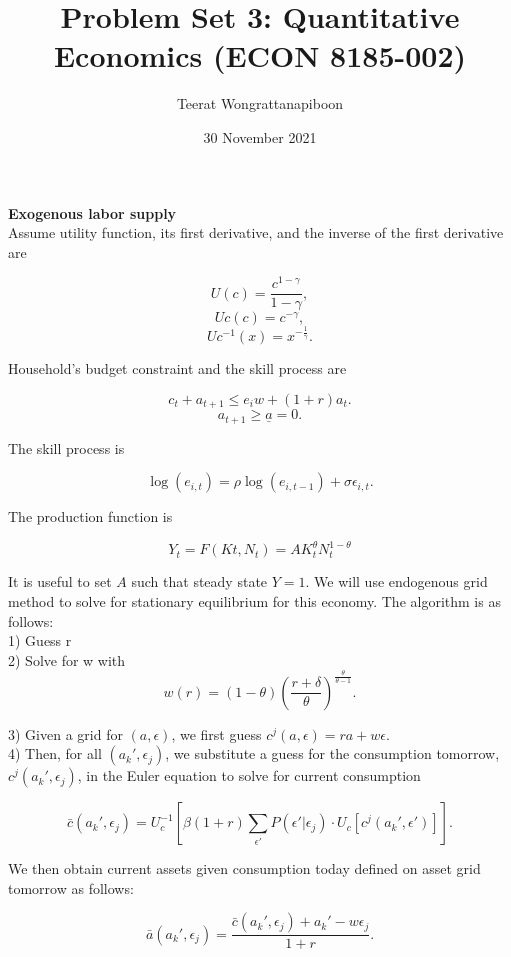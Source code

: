 \documentclass{article}
\title{Problem Set 3: Quantitative Economics (ECON 8185-002)}
\author{Teerat Wongrattanapiboon}
\date{30 November 2021}
\begin{document}
	\maketitle
	
	\noindent\textbf{\Large Exogenous labor supply} \\
	
	Assume utility function, its first derivative, and the inverse of the first derivative are 
	
	$$U(c) = \frac{c^{1-\gamma}}{1-\gamma},$$
	$$Uc(c) = c^{-\gamma},$$
	$$Uc^{-1}(x) = x^{-\frac{1}{\gamma}}.$$
	
	Household's budget constraint and the skill process are
	
	$$c_{t} + a_{t+1} \leq e_{i}w + (1+r)a_{t}.$$
	$$a_{t+1} \geq \underline{a} = 0.$$
	
	The skill process is
	
	$$\log(e_{i,t}) = \rho\log(e_{i,t-1}) + \sigma \epsilon_{i,t}.$$
	
	The production function is 
	
	$$Y_{t} = F(K{t},N_{t}) = AK_{t}^{\theta}N_{t}^{1-\theta}$$
	
	It is useful to set $A$ such that steady state $Y = 1$. We will use endogenous grid method to solve for stationary equilibrium for this economy. The algorithm is as follows: \\ 
	
	1) Guess r \\
		
	2) Solve for w with \\
	
	$$w(r) = (1-\theta)\left(\frac{r+\delta}{\theta}\right)^{\frac{\theta}{\theta-1}}. $$
	
	3) Given a grid for $(a,\epsilon)$, we first guess $c^{j}(a,\epsilon) = ra + w\epsilon$. \\
	
	4) Then, for all $(a_{k}',\epsilon_{j})$, we substitute a guess for the consumption tomorrow, $c^{j}(a_{k}',\epsilon_{j})$, in the Euler equation to solve for current consumption
		
		$$\bar{c}(a_{k}', \epsilon_{j}) = U_{c}^{-1}\left[ \beta (1+r) \sum_{\epsilon'}P(\epsilon'|\epsilon_{j}) \cdot U_{c}\left[ c^{j}(a_{k}',\epsilon') \right] \right].$$
		
		We then obtain current assets given consumption today defined on asset grid tomorrow as follows:
		
		$$\bar{a}(a_{k}', \epsilon_{j}) = \frac{\bar{c}(a_{k}', \epsilon_{j}) + a_{k}' - w\epsilon_{j}}{1+r}.$$
		
\end{document}
